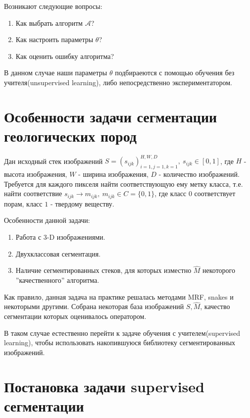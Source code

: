 \documentclass[14pt, a4paper, oneside, bold]{extarticle}
\begin{document}
Возникают следующие вопросы:
\begin{enumerate}
	\item Как выбрать алгоритм $\mathcal{A}$?
	\item Как настроить параметры $\theta$?
	\item Как оценить ошибку алгоритма?
\end{enumerate}

В данном случае наши параметры $\theta$ подбираеются с помощью 
обучения без учителя(unsupervised learning), либо непосредственно 
экспериментатором.

\newpage


\section{Особенности задачи сегментации геологических пород}

Дан исходный стек изображений 
	$S = (s_{ijk})_{i=1, j=1, k=1}^{H, W, D},\ s_{ijk} \in [0, 1]$, где 
$H$ - высота изображения, $W$ - ширина изображения, $D$ - количество изображений. 
Требуется для каждого пикселя найти соответствующую ему метку класса, 
т.е. найти соответствие $s_{ijk} \rightarrow m_{ijk},\ m_{ijk} \in C = \{ 0, 1 \} $, где класс $0$ соответствует порам, класс $1$ - твердому веществу.

Особенности данной задачи:
\begin{enumerate}
	\item Работа с 3-D изображениями.
	\item Двухклассовая сегментация.
	\item Наличие сегментированных стеков, для которых изместно 
	$\hat{M}$ некоторого ''качественного'' алгоритма.	
\end{enumerate}

Как правило, данная задача на практике решалась методами MRF, snakes и некоторыми другими. Собрана некоторая база изображений 
$S, \hat{M}$, качество сегментации которых оценивалось оператором.

В таком случае естественно перейти к задаче обучения с учителем(supervised learning), чтобы использовать накопившуюся библиотеку сегментированных изображений. 

\newpage


\section{Постановка задачи supervised сегментации}
\end{document}
